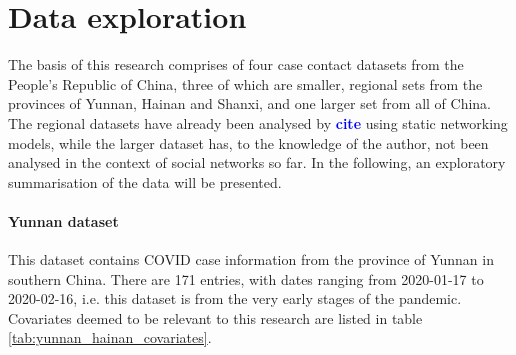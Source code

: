 \documentclass{article}
\newcommand{\add}[1]{\textbf{\textcolor{blue}{#1}}}
\begin{document}
	\section{Data exploration}
	The basis of this research comprises of four case contact datasets from the People's Republic of China, three of which are smaller, regional sets from the provinces of Yunnan, Hainan and Shanxi, and one larger set from all of China. The regional datasets have already been analysed by \add{cite} using static networking models, while the larger dataset has, to the knowledge of the author, not been analysed in the context of social networks so far. In the following, an exploratory summarisation of the data will be presented.
	
	\paragraph{Yunnan dataset} This dataset contains COVID case information from the province of Yunnan in southern China. There are 171 entries, with dates ranging from 2020-01-17 to 2020-02-16, i.e. this dataset is from the very early stages of the pandemic. Covariates deemed to be relevant to this research are listed in table \ref{tab:yunnan_hainan_covariates}.
\end{document}
